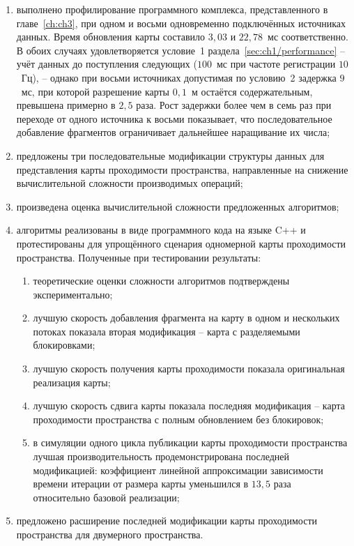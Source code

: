 \begin{enumerate}
	\item выполнено профилирование программного комплекса, представленного в главе~\cref{ch:ch3}, при одном и восьми одновременно подключённых источниках данных. Время обновления карты составило $3,03$ и $22,78$~мс соответственно. В обоих случаях удовлетворяется условие~1 раздела~\cref{sec:ch1/performance} -- учёт данных до поступления следующих ($100$~мс при частоте регистрации $10$~Гц), -- однако при восьми источниках допустимая по условию~2 задержка $9$~мс, при которой разрешение карты $0,1$~м остаётся содержательным, превышена примерно в $2,5$ раза. Рост задержки более чем в семь раз при переходе от одного источника к восьми показывает, что последовательное добавление фрагментов ограничивает дальнейшее наращивание их числа;
	\item предложены три последовательные модификации структуры данных для представления карты проходимости пространства, направленные на снижение вычислительной сложности производимых операций;
	\item произведена оценка вычислительной сложности предложенных алгоритмов;
	\item алгоритмы реализованы в виде программного кода на языке C++ и протестированы для упрощённого сценария одномерной карты проходимости пространства. Полученные при тестировании результаты:
	\begin{enumerate}
	\item теоретические оценки сложности алгоритмов подтверждены экспериментально;
	\item лучшую скорость добавления фрагмента на карту в одном и нескольких потоках показала вторая модификация -- карта с разделяемыми блокировками;
	\item лучшую скорость получения карты проходимости показала оригинальная реализация карты;
	\item лучшую скорость сдвига карты показала последняя модификация -- карта проходимости пространства с полным обновлением без блокировок;
	\item в симуляции одного цикла публикации карты проходимости пространства лучшая производительность продемонстрирована последней модификацией: коэффициент линейной аппроксимации зависимости времени итерации от размера карты уменьшился в $13,5$ раза относительно базовой реализации;
    \end{enumerate}
	\item предложено расширение последней модификации карты проходимости пространства для двумерного пространства.
\end{enumerate}

